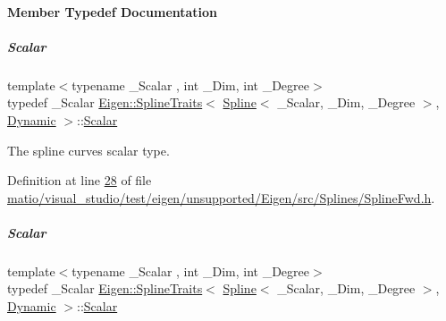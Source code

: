 \paragraph{Member Typedef Documentation}
\mbox{\label{group___splines___module_aa440dee6a559821c867c94ee4bbf60f3}} 
\subparagraph{\texorpdfstring{Scalar}{Scalar}\hspace{0.1cm}{\footnotesize\ttfamily [1/2]}}
{\footnotesize\ttfamily template$<$typename \+\_\+\+Scalar , int \+\_\+\+Dim, int \+\_\+\+Degree$>$ \\
typedef \+\_\+\+Scalar \hyperlink{struct_eigen_1_1_spline_traits}{Eigen\+::\+Spline\+Traits}$<$ \hyperlink{group___splines___module_class_eigen_1_1_spline}{Spline}$<$ \+\_\+\+Scalar, \+\_\+\+Dim, \+\_\+\+Degree $>$, \hyperlink{namespace_eigen_ad81fa7195215a0ce30017dfac309f0b2}{Dynamic} $>$\+::\hyperlink{group___splines___module_aa440dee6a559821c867c94ee4bbf60f3}{Scalar}}

The spline curve\textquotesingle{}s scalar type. 

Definition at line \hyperlink{matio_2visual__studio_2test_2eigen_2unsupported_2_eigen_2src_2_splines_2_spline_fwd_8h_source_l00028}{28} of file \hyperlink{matio_2visual__studio_2test_2eigen_2unsupported_2_eigen_2src_2_splines_2_spline_fwd_8h_source}{matio/visual\+\_\+studio/test/eigen/unsupported/\+Eigen/src/\+Splines/\+Spline\+Fwd.\+h}.

\mbox{\label{group___splines___module_aa440dee6a559821c867c94ee4bbf60f3}} 
\subparagraph{\texorpdfstring{Scalar}{Scalar}\hspace{0.1cm}{\footnotesize\ttfamily [2/2]}}
{\footnotesize\ttfamily template$<$typename \+\_\+\+Scalar , int \+\_\+\+Dim, int \+\_\+\+Degree$>$ \\
typedef \+\_\+\+Scalar \hyperlink{struct_eigen_1_1_spline_traits}{Eigen\+::\+Spline\+Traits}$<$ \hyperlink{group___splines___module_class_eigen_1_1_spline}{Spline}$<$ \+\_\+\+Scalar, \+\_\+\+Dim, \+\_\+\+Degree $>$, \hyperlink{namespace_eigen_ad81fa7195215a0ce30017dfac309f0b2}{Dynamic} $>$\+::\hyperlink{group___splines___module_aa440dee6a559821c867c94ee4bbf60f3}{Scalar}}

